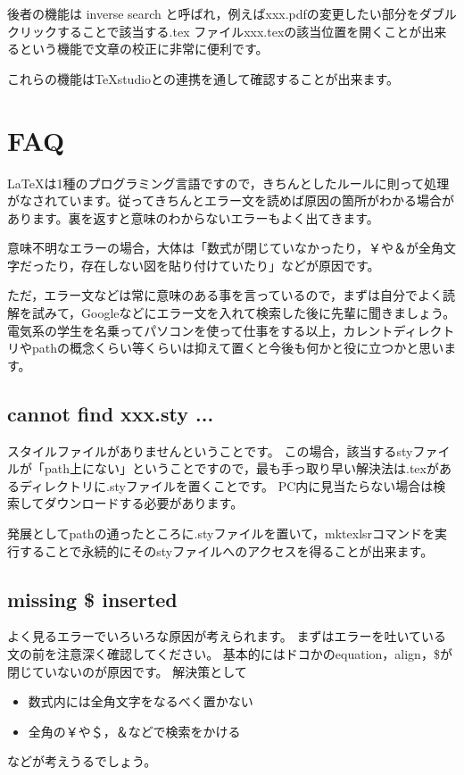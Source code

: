\documentclass[10pt,a4paper,oneside,twocolumn,fleqn,dvipdfmx]{jsarticle}
\begin{document}
後者の機能は inverse search と呼ばれ，例えばxxx.pdfの変更したい部分をダブルクリックすることで該当する.tex ファイルxxx.texの該当位置を開くことが出来るという機能で文章の校正に非常に便利です。

これらの機能はTeXstudioとの連携を通して確認することが出来ます。

\section{FAQ}

\LaTeX は1種のプログラミング言語ですので，きちんとしたルールに則って処理がなされています。従ってきちんとエラー文を読めば原因の箇所がわかる場合があります。裏を返すと意味のわからないエラーもよく出てきます。

意味不明なエラーの場合，大体は「数式が閉じていなかったり，￥や＆が全角文字だったり，存在しない図を貼り付けていたり」などが原因です。

ただ，エラー文などは常に意味のある事を言っているので，まずは自分でよく読解を試みて，Googleなどにエラー文を入れて検索した後に先輩に聞きましょう。電気系の学生を名乗ってパソコンを使って仕事をする以上，カレントディレクトリやpathの概念くらい等くらいは抑えて置くと今後も何かと役に立つかと思います。

\subsection{cannot find xxx.sty ...}
スタイルファイルがありませんということです。
この場合，該当するstyファイルが「path上にない」ということですので，最も手っ取り早い解決法は.texがあるディレクトリに.styファイルを置くことです。
PC内に見当たらない場合は検索してダウンロードする必要があります。

発展としてpathの通ったところに.styファイルを置いて，mktexlsrコマンドを実行することで永続的にそのstyファイルへのアクセスを得ることが出来ます。

\subsection{missing \$ inserted}
よく見るエラーでいろいろな原因が考えられます。
まずはエラーを吐いている文の前を注意深く確認してください。
基本的にはドコかのequation，align，\$が閉じていないのが原因です。
解決策として
\begin{itemize}
	\item 数式内には全角文字をなるべく置かない
	\item 全角の￥や＄，＆などで検索をかける
\end{itemize}
などが考えうるでしょう。
\end{document}
